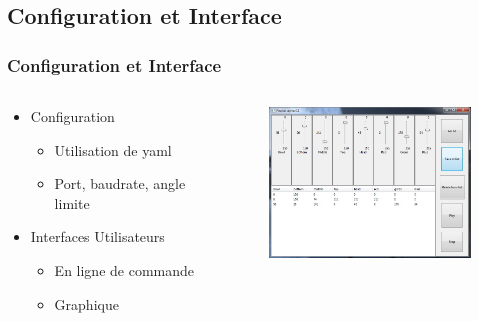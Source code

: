 \subsection{Configuration et Interface}
\begin{frame}
  \frametitle{Configuration et Interface}
  \begin{columns}[c]
    \begin{column}{.4\textwidth}
      \begin{itemize}
        \item Configuration
          \begin{itemize}
            \item Utilisation de yaml
            \item Port, baudrate, angle limite
          \end{itemize}
        \item Interfaces Utilisateurs
          \begin{itemize}
            \item En ligne de commande
            \item Graphique
          \end{itemize}
      \end{itemize}
    \end{column}
    \begin{column}{.6\textwidth}
      \begin{figure}[ht]
        \centering
        \includegraphics[width=6cm]{../img/gui.jpg}
      \end{figure}
    \end{column}
  \end{columns}
\end{frame}
